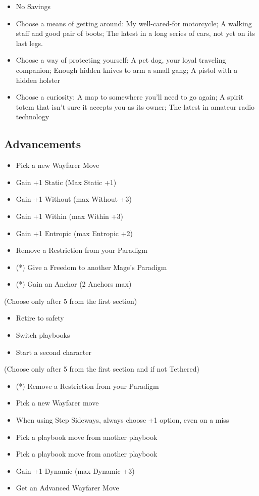 \documentclass[
  oneside,
  statementpaper,
  9pt]{memoir}
\begin{document}
\begin{itemize}
\tightlist
\item
  No Savings
\item
  Choose a means of getting around: My well-cared-for motorcycle; A
  walking staff and good pair of boots; The latest in a long series of
  cars, not yet on its last legs.
\item
  Choose a way of protecting yourself: A pet dog, your loyal traveling
  companion; Enough hidden knives to arm a small gang; A pistol with a
  hidden holster
\item
  Choose a curiosity: A map to somewhere you'll need to go again; A
  spirit totem that isn't sure it accepts you as its owner; The latest
  in amateur radio technology
\end{itemize}

\hypertarget{advancements-8}{%
\subsection{Advancements}\label{advancements-8}}

\begin{itemize}
\tightlist
\item
  Pick a new Wayfarer Move
\item
  Gain +1 Static (Max Static +1)
\item
  Gain +1 Without (max Without +3)
\item
  Gain +1 Within (max Within +3)
\item
  Gain +1 Entropic (max Entropic +2)
\item
  Remove a Restriction from your Paradigm
\item
  (*) Give a Freedom to another Mage's Paradigm
\item
  (*) Gain an Anchor (2 Anchors max)
\end{itemize}

(Choose only after 5 from the first section)

\begin{itemize}
\tightlist
\item
  Retire to safety
\item
  Switch playbooks
\item
  Start a second character
\end{itemize}

(Choose only after 5 from the first section and if not Tethered)

\begin{itemize}
\tightlist
\item
  (*) Remove a Restriction from your Paradigm
\item
  Pick a new Wayfarer move
\item
  When using Step Sideways, always choose +1 option, even on a miss
\item
  Pick a playbook move from another playbook
\item
  Pick a playbook move from another playbook
\item
  Gain +1 Dynamic (max Dynamic +3)
\item
  Get an Advanced Wayfarer Move
\end{itemize}
\end{document}
